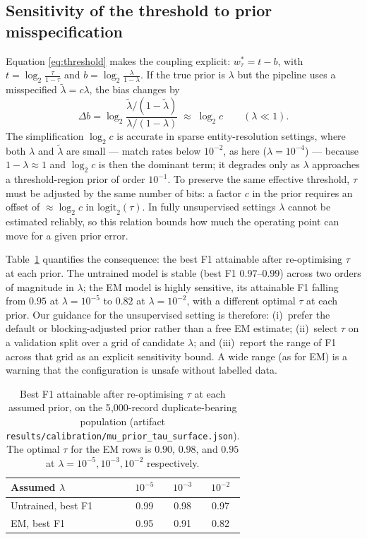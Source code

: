 \documentclass[11pt]{article}
\begin{document}
\subsection{Sensitivity of the threshold to prior misspecification}
\label{sec:sensitivity}
Equation \eqref{eq:threshold} makes the coupling explicit:
$w_\tau^*=t-b$, with $t=\log_2\frac{\tau}{1-\tau}$ and $b=\log_2\frac{\lambda}{1-\lambda}$.
If the true prior is $\lambda$ but the pipeline uses a misspecified $\tilde\lambda=c\lambda$,
the bias changes by
\begin{equation}
\Delta b=\log_2\frac{\tilde\lambda/(1-\tilde\lambda)}{\lambda/(1-\lambda)}
\;\approx\;\log_2 c\qquad(\lambda\ll 1).
\end{equation}
The simplification $\log_2 c$ is accurate in sparse entity-resolution settings, where both
$\lambda$ and $\tilde\lambda$ are small --- match rates below $10^{-2}$, as here
($\lambda=10^{-4}$) --- because $1-\lambda\approx1$ and $\log_2 c$ is then the dominant term;
it degrades only as $\lambda$ approaches a threshold-region prior of order $10^{-1}$.
To preserve the same effective threshold, $\tau$ must be adjusted by the same number of
bits: a factor $c$ in the prior requires an offset of $\approx\log_2 c$ in
$\mathrm{logit}_2(\tau)$. In fully unsupervised settings $\lambda$ cannot be estimated
reliably, so this relation bounds how much the operating point can move for a given prior
error.

Table~\ref{tab:sens} quantifies the consequence: the best F1 attainable after re-optimising
$\tau$ at each prior. The untrained model is stable (best F1 $0.97$--$0.99$) across two
orders of magnitude in $\lambda$; the EM model is highly sensitive, its attainable F1
falling from $0.95$ at $\lambda=10^{-5}$ to $0.82$ at $\lambda=10^{-2}$, with a different
optimal $\tau$ at each prior. Our guidance for the
unsupervised setting is therefore: (i)~prefer the default or blocking-adjusted prior rather
than a free EM estimate; (ii)~select $\tau$ on a validation split over a grid of candidate
$\lambda$; and (iii)~report the range of F1 across that grid as an explicit sensitivity
bound. A wide range (as for EM) is a warning that the configuration is unsafe without
labelled data.

\begin{table}[h]
\centering
\caption{Best F1 attainable after re-optimising $\tau$ at each assumed prior, on the
5{,}000-record duplicate-bearing population (artifact
\texttt{results/calibration/mu\_prior\_tau\_surface.json}). The optimal $\tau$ for the EM
rows is $0.90$, $0.98$, and $0.95$ at $\lambda=10^{-5}, 10^{-3}, 10^{-2}$ respectively.}
\label{tab:sens}
\begin{tabular}{lccc}
\toprule
Assumed $\lambda$ & $10^{-5}$ & $10^{-3}$ & $10^{-2}$ \\
\midrule
Untrained, best F1 & 0.99 & 0.98 & 0.97 \\
EM, best F1 & 0.95 & 0.91 & 0.82 \\
\bottomrule
\end{tabular}
\end{table}
\end{document}
